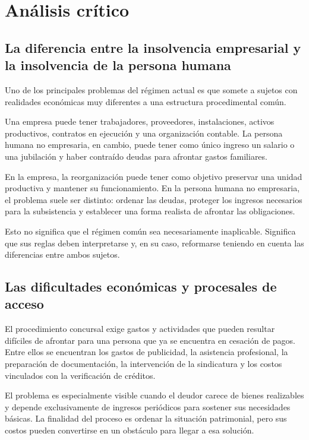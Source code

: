 \documentclass[12pt,oneside]{book}
\begin{document}
\chapter[Análisis crítico]{Análisis crítico}

\section{La diferencia entre la insolvencia empresarial y la insolvencia de la persona humana}

Uno de los principales problemas del régimen actual es que somete a sujetos con realidades económicas muy diferentes a una estructura procedimental común.

Una empresa puede tener trabajadores, proveedores, instalaciones, activos productivos, contratos en ejecución y una organización contable. La persona humana no empresaria, en cambio, puede tener como único ingreso un salario o una jubilación y haber contraído deudas para afrontar gastos familiares.

En la empresa, la reorganización puede tener como objetivo preservar una unidad productiva y mantener su funcionamiento. En la persona humana no empresaria, el problema suele ser distinto: ordenar las deudas, proteger los ingresos necesarios para la subsistencia y establecer una forma realista de afrontar las obligaciones.

Esto no significa que el régimen común sea necesariamente inaplicable. Significa que sus reglas deben interpretarse y, en su caso, reformarse teniendo en cuenta las diferencias entre ambos sujetos.

\section{Las dificultades económicas y procesales de acceso}

El procedimiento concursal exige gastos y actividades que pueden resultar difíciles de afrontar para una persona que ya se encuentra en cesación de pagos. Entre ellos se encuentran los gastos de publicidad, la asistencia profesional, la preparación de documentación, la intervención de la sindicatura y los costos vinculados con la verificación de créditos.

El problema es especialmente visible cuando el deudor carece de bienes realizables y depende exclusivamente de ingresos periódicos para sostener sus necesidades básicas. La finalidad del proceso es ordenar la situación patrimonial, pero sus costos pueden convertirse en un obstáculo para llegar a esa solución.
\end{document}
